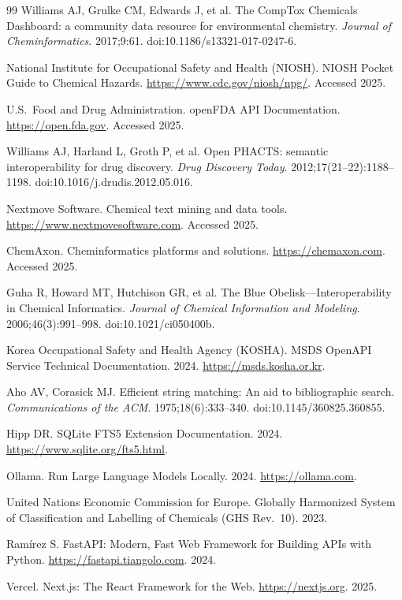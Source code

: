 \documentclass[10pt]{article}
\begin{document}
\begin{thebibliography}{99}
Williams AJ, Grulke CM, Edwards J, et al.
The CompTox Chemicals Dashboard: a community data resource for environmental chemistry.
\emph{Journal of Cheminformatics}. 2017;9:61.
doi:10.1186/s13321-017-0247-6.

National Institute for Occupational Safety and Health (NIOSH).
NIOSH Pocket Guide to Chemical Hazards.
\url{https://www.cdc.gov/niosh/npg/}. Accessed 2025.

U.S.\ Food and Drug Administration.
openFDA API Documentation.
\url{https://open.fda.gov}. Accessed 2025.

Williams AJ, Harland L, Groth P, et al.
Open PHACTS: semantic interoperability for drug discovery.
\emph{Drug Discovery Today}. 2012;17(21--22):1188--1198.
doi:10.1016/j.drudis.2012.05.016.

Nextmove Software.
Chemical text mining and data tools.
\url{https://www.nextmovesoftware.com}. Accessed 2025.

ChemAxon.
Cheminformatics platforms and solutions.
\url{https://chemaxon.com}. Accessed 2025.

Guha R, Howard MT, Hutchison GR, et al.
The Blue Obelisk---Interoperability in Chemical Informatics.
\emph{Journal of Chemical Information and Modeling}. 2006;46(3):991--998.
doi:10.1021/ci050400b.

Korea Occupational Safety and Health Agency (KOSHA).
MSDS OpenAPI Service Technical Documentation. 2024.
\url{https://msds.kosha.or.kr}.

Aho AV, Corasick MJ.
Efficient string matching: An aid to bibliographic search.
\emph{Communications of the ACM}. 1975;18(6):333--340.
doi:10.1145/360825.360855.

Hipp DR.
SQLite FTS5 Extension Documentation. 2024.
\url{https://www.sqlite.org/fts5.html}.

Ollama.
Run Large Language Models Locally. 2024.
\url{https://ollama.com}.

United Nations Economic Commission for Europe.
Globally Harmonized System of Classification and Labelling of Chemicals (GHS Rev.~10). 2023.

Ram\'{i}rez S.
FastAPI: Modern, Fast Web Framework for Building APIs with Python.
\url{https://fastapi.tiangolo.com}. 2024.

Vercel.
Next.js: The React Framework for the Web.
\url{https://nextjs.org}. 2025.


\end{thebibliography}
\end{document}
